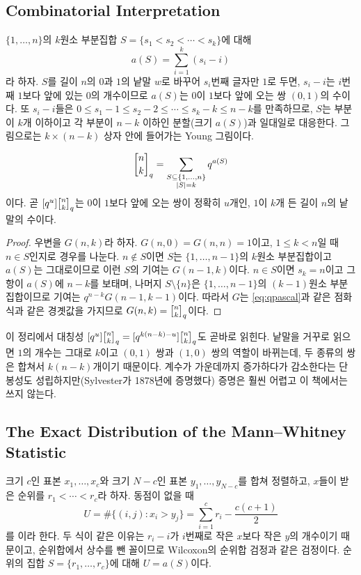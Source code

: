 \subsection{Combinatorial Interpretation}

$\{1,\dots,n\}$의 $k$원소 부분집합 $S=\{s_1<s_2<\cdots<s_k\}$에 대해
\[
a(S)=\sum_{i=1}^k(s_i-i)
\]
라 하자. $S$를 길이 $n$의 $0$과 $1$의 낱말 $w$로 바꾸어 $s_i$번째 글자만 $1$로 두면, $s_i-i$는 $i$번째 $1$보다 앞에 있는 $0$의 개수이므로 $a(S)$는 $0$이 $1$보다 앞에 오는 쌍 $(0,1)$의 수이다. 또 $s_i-i$들은 $0\le s_1-1\le s_2-2\le\cdots\le s_k-k\le n-k$를 만족하므로, $S$는 부분이 $k$개 이하이고 각 부분이 $n-k$ 이하인 분할(크기 $a(S)$)과 일대일로 대응한다. 그림으로는 $k\times(n-k)$ 상자 안에 들어가는 Young 그림이다.

\begin{theorem}
\label{thm:qbinom-count}
\[
\qbinom nk=\sum_{\substack{S\subseteq\{1,\dots,n\}\\|S|=k}}q^{a(S)}
\]
이다. 곧 $[q^u]\qbinom nk$는 $0$이 $1$보다 앞에 오는 쌍이 정확히 $u$개인, $1$이 $k$개 든 길이 $n$의 낱말의 수이다.
\end{theorem}

\begin{proof}
우변을 $G(n,k)$라 하자. $G(n,0)=G(n,n)=1$이고, $1\le k<n$일 때 $n\in S$인지로 경우를 나눈다. $n\notin S$이면 $S$는 $\{1,\dots,n-1\}$의 $k$원소 부분집합이고 $a(S)$는 그대로이므로 이런 $S$의 기여는 $G(n-1,k)$이다. $n\in S$이면 $s_k=n$이고 그 항이 $a(S)$에 $n-k$를 보태며, 나머지 $S\setminus\{n\}$은 $\{1,\dots,n-1\}$의 $(k-1)$원소 부분집합이므로 기여는 $q^{n-k}G(n-1,k-1)$이다. 따라서 $G$는 \cref{eq:qpascal}과 같은 점화식과 같은 경곗값을 가지므로 $G(n,k)=\qbinom nk$이다.
\end{proof}

이 정리에서 대칭성 $[q^u]\qbinom nk=[q^{k(n-k)-u}]\qbinom nk$도 곧바로 읽힌다. 낱말을 거꾸로 읽으면 $1$의 개수는 그대로 $k$이고 $(0,1)$ 쌍과 $(1,0)$ 쌍의 역할이 바뀌는데, 두 종류의 쌍은 합쳐서 $k(n-k)$개이기 때문이다. 계수가 가운데까지 증가하다가 감소한다는 단봉성도 성립하지만(Sylvester가 1878년에 증명했다) 증명은 훨씬 어렵고 이 책에서는 쓰지 않는다.

\subsection{The Exact Distribution of the Mann--Whitney Statistic}

크기 $c$인 표본 $x_1,\dots,x_c$와 크기 $N-c$인 표본 $y_1,\dots,y_{N-c}$를 합쳐 정렬하고, $x$들이 받은 순위를 $r_1<\cdots<r_c$라 하자. 동점이 없을 때
\[
U=\#\{(i,j):x_i>y_j\}=\sum_{i=1}^cr_i-\frac{c(c+1)}2
\]
를 이라 한다\cite{mannwhitney1947}. 두 식이 같은 이유는 $r_i-i$가 $i$번째로 작은 $x$보다 작은 $y$의 개수이기 때문이고, 순위합에서 상수를 뺀 꼴이므로 Wilcoxon의 순위합 검정\cite{wilcoxon1945}과 같은 검정이다. 순위의 집합 $S=\{r_1,\dots,r_c\}$에 대해 $U=a(S)$이다.

